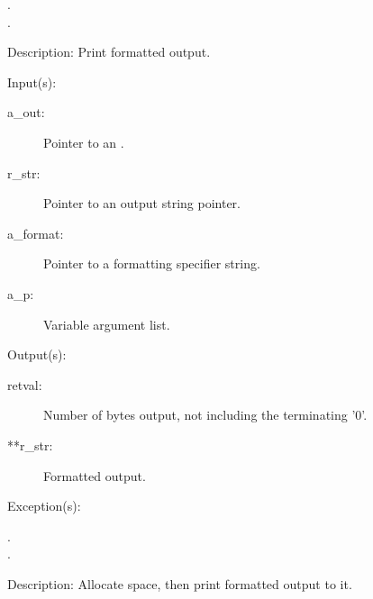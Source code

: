 \begin{capi}
\begin{capilist}
		\begin{description}\item[]
		\item[.]
		\item[.]
		\end{description}
	\item[Description: ]
		Print formatted output.
	\end{capilist}
\label{out_put_sva}
	\begin{capilist}
	\item[Input(s): ]
		\begin{description}\item[]
		\item[a\_out: ]
			Pointer to an .
		\item[r\_str: ]
			Pointer to an output string pointer.
		\item[a\_format: ]
			Pointer to a formatting specifier string.
		\item[a\_p: ]
			Variable argument list.
		\end{description}
	\item[Output(s): ]
		\begin{description}\item[]
		\item[retval: ]
			Number of bytes output, not including the terminating
			'{\bs}0'.
		\item[**r\_str: ]
			Formatted output.
		\end{description}
	\item[Exception(s): ]
		\begin{description}\item[]
		\item[.]
		\item[.]
		\end{description}
	\item[Description: ]
		Allocate space, then print formatted output to it.
	\end{capilist}
\label{out_put_svn}
	\begin{capilist}

\end{capilist}
\end{capi}
